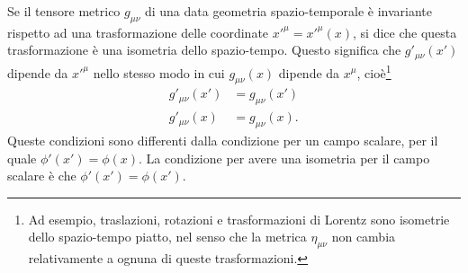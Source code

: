 Se il tensore metrico $g_{\mu \nu}$ di una data geometria spazio-temporale è
invariante rispetto ad una trasformazione delle coordinate
$x'^{\mu}=x'^{\mu}(x)$, si dice che questa trasformazione è una isometria dello
spazio-tempo.  Questo significa che $g'_{\mu \nu}(x')$ dipende da $x'^{\mu}$
nello stesso modo in cui $g_{\mu \nu}(x)$ dipende da $x^{\mu}$, cioè\footnote{Ad
  esempio, traslazioni, rotazioni e trasformazioni di Lorentz sono isometrie
  dello spazio-tempo piatto, nel senso che la metrica $\eta_{\mu \nu}$ non
  cambia relativamente a ognuna di queste trasformazioni.}
\begin{subequations}
  \label{W13.1.1}
  \begin{align}
    g'_{\mu \nu} (x') &= g_{\mu \nu}(x') \\
    g'_{\mu \nu} (x) &= g_{\mu \nu}(x).
  \end{align}
\end{subequations}
Queste condizioni sono differenti dalla condizione per un campo scalare, per il
quale $\phi'(x')=\phi(x)$.  La condizione per avere una isometria per il campo
scalare è che $\phi'(x') = \phi(x')$.

